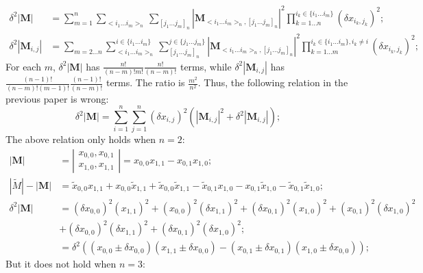 \documentclass[twoside]{article}
\numberwithin{equation}{section}
\begin{document}
\begin{align*}
\delta^2 |\mathbf{M}| &= \sum_{m=1}^{n} \sum_{<i_1 \dots i_m>_n} \sum_{[j_1 \dots j_m]_n}
  		|\mathbf{M} _{<i_1 \dots i_m>_n, [j_1 \dots j_m]_n}|^2  \prod_{k=1 \dots n}^{i_k \in \{i_1 \dots i_m\}} (\delta x_{i_k, j_k})^2; \\
\delta^2 |\mathbf{M}_{i,j}| &= \sum_{m=2 \dots n} \sum_{<i_1 \dots i_m>_n}^{i \in \{i_1 \dots i_m\}} \sum_{[j_1 \dots j_m]_n}^{j \in \{j_1 \dots j_m\}}
  	|\mathbf{M} _{<i_1 \dots i_m>_n, [j_1 \dots j_m]_n}|^2  \prod_{k=1 \dots m}^{i_k \in \{i_1 \dots i_m\}, i_k \ne i} (\delta x_{i_k, j_k})^2;
\end{align*}
For each $m$, $\delta^2 |\mathbf{M}|$ has  $\frac{n!}{(n - m)! m!} \frac{n!}{(n - m)!}$ terms, while $\delta^2 |\mathbf{M}_{i,j}|$ has $\frac{(n - 1)!}{(n - m)! (m - 1)!} \frac{(n - 1)!}{(n - m)!}$ terms.  The ratio is $\frac{m^2}{n^2}$.
Thus, the following relation in the previous paper is wrong:
\begin{equation*}
\delta^2 |\mathbf{M}| = \sum_{i=1}^{n} \sum_{j=1}^{n} (\delta x_{i, j})^2 \left(|\mathbf{M}_{i, j}|^2 + \delta^2 |\mathbf{M}_{i,j}| \right);
\end{equation*}
The above relation only holds when $n=2$:
\begin{align*}
|\mathbf{M}| &= \left| \begin{matrix} x_{0,0}, x_{0,1} \\ x_{1,0}, x_{1,1} \end{matrix} \right| = x_{0,0} x_{1,1} - x_{0,1} x_{1,0};  \\
|\tilde{M}| - |\mathbf{M}| &= \tilde{x}_{0,0} x_{1,1} + x_{0,0} \tilde{x}_{1,1} + \tilde{x}_{0,0} \tilde{x}_{1,1}
	 - \tilde{x}_{0,1} x_{1,0} - x_{0,1} \tilde{x}_{1,0} - \tilde{x}_{0,1} \tilde{x}_{1,0}; \\
\delta^2 |\mathbf{M}| &= (\delta x_{0,0})^2 (x_{1,1})^2 + (x_{0,0})^2 (\delta x_{1,1})^2 +  (\delta x_{0,1})^2 (x_{1,0})^2 + (x_{0,1})^2 (\delta x_{1,0})^2 \\
		&+ (\delta x_{0,0})^2 (\delta x_{1,1})^2 + (\delta x_{0,1})^2 (\delta x_{1,0})^2; \\
	&= \delta^2 \left( (x_{0,0} \pm \delta x_{0,0}) (x_{1,1} \pm \delta x_{0,0}) -  (x_{0,1} \pm \delta x_{0,1}) (x_{1,0} \pm \delta x_{0,0}) \right);
\end{align*}
But it does not hold when $n=3$:
\end{document}
